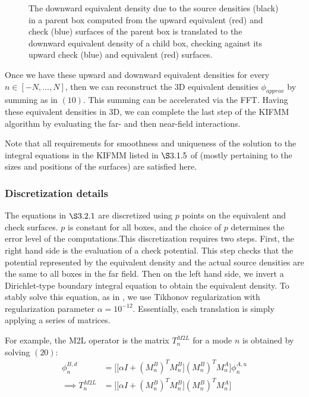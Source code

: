 \documentclass[11pt, oneside]{article}   	%
\begin{document}
\begin{figure}[!ht]
\begin{center}
\end{center}
\caption{The downward equivalent density due to the source densities (black) in a parent box computed from the upward equivalent (red) and check (blue) surfaces of the parent box is translated to the downward equivalent density of a child box, checking against its upward check (blue) and equivalent (red) surfaces.}
\end{figure}

Once we have these upward and downward equivalent densities for every $n\in[-N,\dots,N]$, then we can reconstruct the 3D equivalent densities $\phi_{approx}$ by summing as in $(10)$. This summing can be accelerated via the FFT. Having these equivalent densities in 3D, we can complete the last step of the KIFMM algorithm by evaluating the far- and then near-field interactions.

Note that all requirements for smoothness and uniqueness of the solution to the integral equations in the KIFMM listed in $\S3.1.5$ of \cite{YBZ} (mostly pertaining to the sizes and positions of the surfaces) are satisfied here.

\subsubsection{Discretization details}
The equations in $\S3.2.1$ are discretized using $p$ points on the equivalent and check surfaces. $p$ is constant for all boxes, and the choice of $p$ determines the error level of the computations.This discretization requires two steps. First, the right hand side is the evaluation of a check potential. This step checks that the potential represented by the equivalent density and the actual source densities are the same to all boxes in the far field. Then on the left hand side, we invert a Dirichlet-type boundary integral equation to obtain the equivalent density. To stably solve this equation, as in \cite{YBZ}, we use Tikhonov regularization with regularization parameter $\alpha=10^{-12}$. Essentially, each translation is simply applying a series of matrices.

For example, the M2L operator is the matrix $T^{M2L}_n$ for a mode $n$ is obtained by solving $(20)$:
\begin{align}
\phi^{B,d}_n&=\bigg[\big[\alpha I +(M_n^B)^TM_n^B\big](M_n^B)^TM_n^A\bigg]\phi^{A,u}_n\\
\implies T^{M2L}_n &= \bigg[\big[\alpha I +(M_n^B)^TM_n^B\big](M_n^B)^TM_n^A\bigg]
\end{align}
\end{document}

